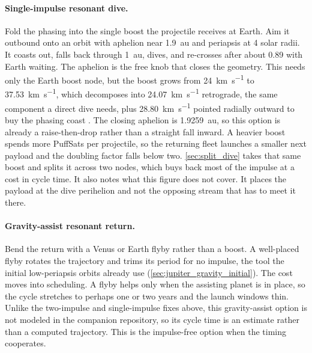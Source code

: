 \documentclass{article}
\begin{document}
\paragraph{Single-impulse resonant dive.} Fold the phasing into the single boost the projectile receives at Earth. Aim it outbound onto an orbit with aphelion near \SI{1.9}{\astronomicalunit} and periapsis at 4 solar radii. It coasts out, falls back through \SI{1}{\astronomicalunit}, dives, and re-crosses after about \SI{0.89}{\year} with Earth waiting. The aphelion is the free knob that closes the geometry. This needs only the Earth boost node, but the boost grows from \SI{24}{\kilo\meter\per\second} to \SI{37.53}{\kilo\meter\per\second}, which decomposes into \SI{24.07}{\kilo\meter\per\second} retrograde, the same component a direct dive needs, plus \SI{28.80}{\kilo\meter\per\second} pointed radially outward to buy the phasing coast \cite{Katz_aim_is_all_you_need_2025}. The closing aphelion is \SI{1.9259}{\astronomicalunit}, so this option is already a raise-then-drop rather than a straight fall inward. A heavier boost spends more PuffSats per projectile, so the returning fleet launches a smaller next payload and the doubling factor falls below two. \autoref{sec:split_dive} takes that same boost and splits it across two nodes, which buys back most of the impulse at a cost in cycle time. It also notes what this figure does not cover. It places the payload at the dive perihelion and not the opposing stream that has to meet it there.

\paragraph{Gravity-assist resonant return.} Bend the return with a Venus or Earth flyby rather than a boost. A well-placed flyby rotates the trajectory and trims its period for no impulse, the tool the initial low-periapsis orbits already use (\autoref{sec:jupiter_gravity_initial}). The cost moves into scheduling. A flyby helps only when the assisting planet is in place, so the cycle stretches to perhaps one or two years and the launch windows thin. Unlike the two-impulse and single-impulse fixes above, this gravity-assist option is not modeled in the companion repository, so its cycle time is an estimate rather than a computed trajectory. This is the impulse-free option when the timing cooperates.
\end{document}
